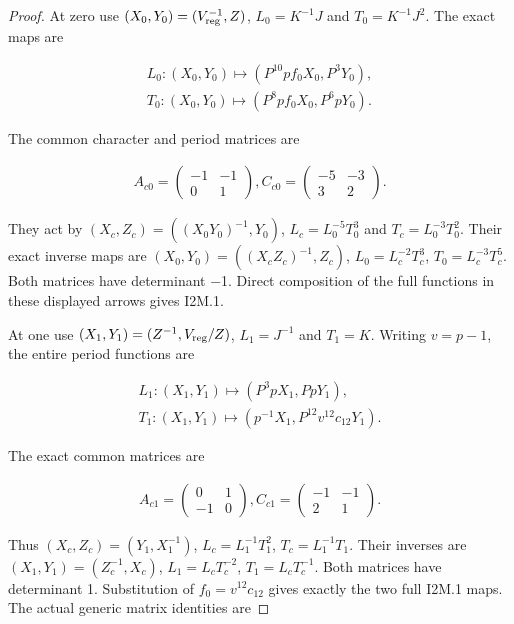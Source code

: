 \begin{proof}
At zero use \((X_{0},Y_{0})=(V_{\rm reg}^{-1},Z)\), \(L_{0}=K^{-1}J\) and \(T_{0}=K^{-1}J^{2}\).
The exact maps are

\[
\begin{gathered}
L_{0}:(X_{0},Y_{0})\longmapsto (P^{10} p f_{0} X_{0},P^{3}Y_{0}), \\
T_{0}:(X_{0},Y_{0})\longmapsto (P^{8} p f_{0} X_{0},P^{6} pY_{0}).
\end{gathered}
\]

The common character and period matrices are

\[
\begin{gathered}
A_{c0}=\begin{pmatrix}-1&-1\\0&1\end{pmatrix}, C_{c0}=\begin{pmatrix}-5&-3\\3&2\end{pmatrix}.
\end{gathered}
\]

They act by \((X_c,Z_c)=((X_{0}Y_{0})^{-1},Y_{0})\), \(L_c=L_{0}^{-5} T_{0}^{3}\) and
\(T_c=L_{0}^{-3} T_{0}^{2}\). Their exact inverse maps are
\((X_{0},Y_{0})=((X_cZ_c)^{-1},Z_c)\), \(L_{0}=L_c^{-2} T_c^{3}\), \(T_{0}=L_c^{-3} T_c^{5}\).
Both matrices have determinant −1. Direct composition of the
full functions in these displayed arrows gives I2M.1.

At one use \((X_{1},Y_{1})=(Z^{-1},V_{\rm reg}/Z)\), \(L_{1}=J^{-1}\) and \(T_{1}=K\).
Writing \(v=p-1\), the entire period functions are

\[
\begin{gathered}
L_{1}:(X_{1},Y_{1})\longmapsto (P^{3}p X_{1},PpY_{1}), \\
T_{1}:(X_{1},Y_{1})\longmapsto (p^{-1} X_{1},P^{12} v^{12} c_{12} Y_{1}).
\end{gathered}
\]

The exact common matrices are

\[
\begin{gathered}
A_{c1}=\begin{pmatrix}0&1\\-1&0\end{pmatrix}, C_{c1}=\begin{pmatrix}-1&-1\\2&1\end{pmatrix}.
\end{gathered}
\]

Thus \((X_c,Z_c)=(Y_{1},X_{1}^{-1})\), \(L_c=L_{1}^{-1} T_{1}^{2}\), \(T_c=L_{1}^{-1}T_{1}\).
Their inverses are \((X_{1},Y_{1})=(Z_c^{-1},X_c)\), \(L_{1}=L_c T_c^{-2}\),
\(T_{1}=L_c T_c^{-1}\). Both matrices have determinant 1. Substitution
of \(f_{0}=v^{12} c_{12}\) gives exactly the two full I2M.1 maps.
The actual generic matrix identities are


\end{proof}
